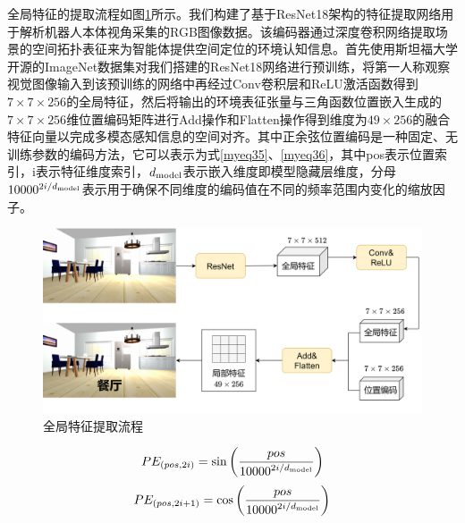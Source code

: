 全局特征的提取流程如图\ref{全局特征提取}所示。我们构建了基于ResNet18架构的特征提取网络用于解析机器人本体视角采集的RGB图像数据。该编码器通过深度卷积网络提取场景的空间拓扑表征来为智能体提供空间定位的环境认知信息。首先使用斯坦福大学开源的ImageNet数据集对我们搭建的ResNet18网络进行预训练，将第一人称观察视觉图像输入到该预训练的网络中再经过Conv卷积层和ReLU激活函数得到$7 \times 7 \times 256$的全局特征，然后将输出的环境表征张量与三角函数位置嵌入生成的$7 \times 7 \times 256$维位置编码矩阵进行Add操作和Flatten操作得到维度为$49 \times 256$的融合特征向量以完成多模态感知信息的空间对齐。其中正余弦位置编码是一种固定、无训练参数的编码方法，它可以表示为式\ref{myeq35}、\ref{myeq36}，其中pos表示位置索引，i表示特征维度索引，$d_{{\rm{model}}}$表示嵌入维度即模型隐藏层维度，分母${10000^{{{2i} \mathord{\left/
 {\vphantom {{2i} {{d_{{\rm{model}}}}}}} \right.
 \kern-\nulldelimiterspace} {{d_{{\rm{model}}}}}}}}$表示用于确保不同维度的编码值在不同的频率范围内变化的缩放因子。
\begin{figure}[htbp]
    \centering
    \includegraphics[scale=0.06]{Fig/全局特征提取.png}
    \caption{\label{全局特征提取}全局特征提取流程}
\end{figure}

\begin{equation}
    P{E_{\left( {pos,2i} \right)}} = \sin \left( {\frac{{pos}}{{{{10000}^{{{2i} \mathord{\left/
 {\vphantom {{2i} {{d_{{\rm{model}}}}}}} \right.
 \kern-\nulldelimiterspace} {{d_{{\rm{model}}}}}}}}}}} \right)
    \label{myeq35}
\end{equation}
\begin{equation}
    P{E_{\left( {pos,2i + 1} \right)}} = \cos \left( {\frac{{pos}}{{{{10000}^{{{2i} \mathord{\left/
 {\vphantom {{2i} {{d_{{\rm{model}}}}}}} \right.
 \kern-\nulldelimiterspace} {{d_{{\rm{model}}}}}}}}}}} \right)
    \label{myeq36}
\end{equation}

